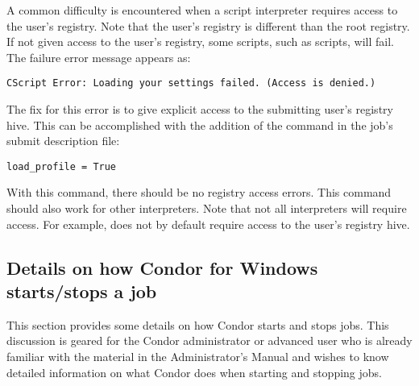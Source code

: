A common difficulty is encountered when
a script interpreter requires access to the user's registry.
Note that the user's registry is different than the root registry.
If not given access to the user's registry,
some scripts, such as  scripts,
will fail.
The failure error message appears as: 

\begin{verbatim}
CScript Error: Loading your settings failed. (Access is denied.)
\end{verbatim}

The fix for this error is to give explicit access to the submitting
user's registry hive.  This can be accomplished with the addition of
the  command in the job's submit description
file:

\begin{verbatim}
load_profile = True
\end{verbatim}

With this command,
there should be no registry access errors.
This command should also work for other interpreters.
Note that not all interpreters will require access.
For example,
 does not by default require access to the user's
registry hive.

\subsection{Details on how Condor for Windows starts/stops a job}

This section provides some details on how Condor starts and stops jobs.
This discussion is geared for the Condor administrator or advanced user who is
already familiar with the material in the Administrator's Manual
and wishes to know detailed information on what Condor does when
starting and stopping jobs.


